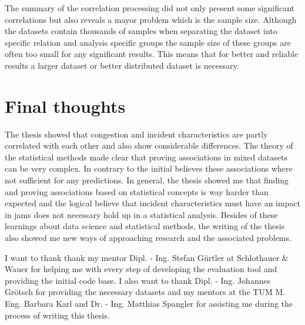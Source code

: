 \bigskip

The summary of the correlation processing did not only present some significant correlations but also reveals a mayor problem which is the sample size. Although the datasets contain thousands of samples when separating the dataset into specific relation and analysis specific groups the sample size of these groups are often too small for any significant results. This means that for better and reliable results a larger dataset or better distributed dataset is necessary.

\section{Final thoughts}
The thesis showed that congestion and incident characteristics are partly correlated with each other and also show considerable differences. The theory of the statistical methods made clear that proving associations in mixed datasets can be very complex. In contrary to the initial believes these associations where not sufficient for any predictions. In general, the thesis showed me that finding and proving associations based on statistical concepts is way harder than expected and the logical believe that incident characteristics must have an impact in jams does not necessary hold up in a statistical analysis. Besides of these learnings about data science and statistical methods, the writing of the thesis also showed me new ways of approaching research and the associated problems. 

\bigskip

I want to thank thank my mentor Dipl. - Ing. Stefan Gürtler at Schlothauer \& Wauer for helping me with every step of developing the evaluation tool and providing the initial code base. I also want to thank Dipl. - Ing. Johannes Grötsch for providing the necessary datasets and my mentors at the TUM M. Eng. Barbara Karl and Dr. - Ing. Matthias Spangler for assisting me during the process of writing this thesis.
